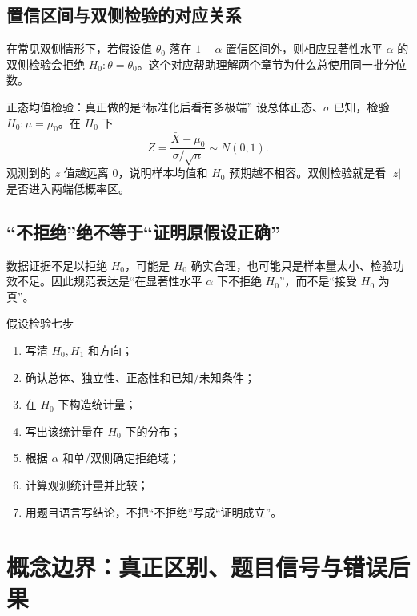 \documentclass[11pt,a4paper,openany]{ctexbook}
\begin{document}
\section{置信区间与双侧检验的对应关系}
在常见双侧情形下，若假设值 $\theta_0$ 落在 $1-\alpha$ 置信区间外，则相应显著性水平 $\alpha$ 的双侧检验会拒绝 $H_0:\theta=\theta_0$。这个对应帮助理解两个章节为什么总使用同一批分位数。

\begin{examplebox}{正态均值检验：真正做的是“标准化后看有多极端”}
设总体正态、$\sigma$ 已知，检验 $H_0:\mu=\mu_0$。在 $H_0$ 下
\[
Z=\frac{\bar X-\mu_0}{\sigma/\sqrt n}\sim N(0,1).
\]
观测到的 $z$ 值越远离 0，说明样本均值和 $H_0$ 预期越不相容。双侧检验就是看 $|z|$ 是否进入两端低概率区。
\end{examplebox}

\section{“不拒绝”绝不等于“证明原假设正确”}
数据证据不足以拒绝 $H_0$，可能是 $H_0$ 确实合理，也可能只是样本量太小、检验功效不足。因此规范表达是“在显著性水平 $\alpha$ 下不拒绝 $H_0$”，而不是“接受 $H_0$ 为真”。

\begin{methodbox}{假设检验七步}
\begin{enumerate}
  \item 写清 $H_0,H_1$ 和方向；
  \item 确认总体、独立性、正态性和已知/未知条件；
  \item 在 $H_0$ 下构造统计量；
  \item 写出该统计量在 $H_0$ 下的分布；
  \item 根据 $\alpha$ 和单/双侧确定拒绝域；
  \item 计算观测统计量并比较；
  \item 用题目语言写结论，不把“不拒绝”写成“证明成立”。
\end{enumerate}
\end{methodbox}

\chapter{概念边界：真正区别、题目信号与错误后果}
\end{document}

